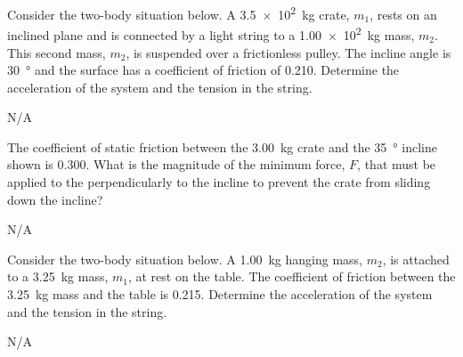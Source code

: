 


\begin{question}[ID=friction-A-Q01,topic=friction,difficulty=A]
    Consider the two-body situation below.
    A \SI{3.5e2}{\kilo\gram} crate, $m_1$, rests on an inclined
        plane and is connected by a light string to a
        \SI{1.00e2}{\kilo\gram} mass, $m_2$.
    This second mass, $m_2$, is suspended over a frictionless
        pulley.
    The incline angle is \SI{30}{\degree} and the surface has a
        coefficient of friction of \num{0.210}.
    Determine the acceleration of the system and the tension
        in the string.
\end{question}
\begin{solution}
    N/A
\end{solution}


\begin{question}[ID=friction-A-Q02,topic=friction,difficulty=A]
    The coefficient of static friction between the \SI{3.00}{\kilo\gram}
        crate and the \SI{35}{\degree} incline shown is \num{0.300}.
    What is the magnitude of the minimum force, $F$, that must
        be applied to the perpendicularly to the incline to
        prevent the crate from sliding down the incline?
\end{question}
\begin{solution}
    N/A
\end{solution}


\begin{question}[ID=friction-A-Q03,topic=friction,difficulty=A]
    Consider the two-body situation below.
    A \SI{1.00}{\kilo\gram} hanging mass, $m_2$, is attached to
        a \SI{3.25}{\kilo\gram} mass, $m_1$, at rest on the table.
    The coefficient of friction between the \SI{3.25}{\kilo\gram}
        mass and the table is \num{0.215}.
    Determine the acceleration of the system and the tension
        in the string.
\end{question}
\begin{solution}
    N/A
\end{solution}


